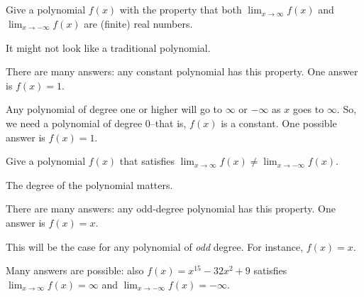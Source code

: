 %
%

\subsection*{\Conceptual}
\begin{Mquestion} Give a polynomial $f(x)$ with the property that both $\displaystyle\lim_{x \rightarrow\infty} f(x)$  and  $\displaystyle\lim_{x \rightarrow -\infty} f(x)$ are (finite) real numbers.
\end{Mquestion}
\begin{hint} It might not look like a traditional polynomial.
\end{hint}
\begin{answer} There are many answers: any constant polynomial has this property. One answer is $f(x)=1$.
\end{answer}
\begin{solution} Any polynomial of degree one or higher will go to $\infty$ or $-\infty$ as $x$ goes to $\infty$. So, we need a polynomial of degree 0--that is, $f(x)$ is a constant. One possible answer is $f(x)=1$.
\end{solution}



\begin{Mquestion}Give a polynomial $f(x)$ that satisfies $\displaystyle\lim_{x \rightarrow\infty} f(x) \neq \displaystyle\lim_{x \rightarrow -\infty} f(x)$.
\end{Mquestion}
\begin{hint} The degree of the polynomial matters.
\end{hint}
\begin{answer} There are many answers: any odd-degree polynomial has this property. One answer is $f(x)=x$.
\end{answer}
\begin{solution} This will be the case for any polynomial of \emph{odd} degree. For instance, $f(x)=x$.

Many answers are possible: also $f(x)=x^{15}-32x^2+9$ satisfies $\displaystyle\lim_{x \rightarrow \infty} f(x) = \infty$ and $\displaystyle\lim_{x \rightarrow -\infty} f(x)= -\infty$.
\end{solution}



